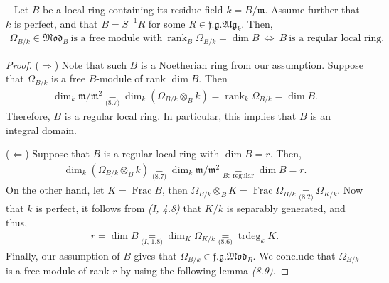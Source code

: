 \documentclass[11pt,a4paper,footinclude=true,headinclude=true]{scrbook} %
\DeclareMathOperator{\Frac}{Frac}
\DeclareMathOperator{\trdeg}{trdeg}
\DeclareMathOperator{\rank}{rank}
\newcommand{\mm}{\mathfrak{m}}
\newcommand{\<}{\langle}
\newcommand{\>}{\rangle}
\newcommand{\fg}{\mathfrak{f.g.}}
\newcommand{\MOD}{\mathfrak{Mod}}
\newcommand{\ALG}{\mathfrak{Alg}}
\newenvironment{theorem}[2][]
{\renewcommand\theinnercustomthm{#2}\innercustomthm[#1]
\begin{mdframed}[backgroundcolor=yellow!20]\ }
{\end{mdframed}\endinnercustomthm}
\begin{document}
\begin{theorem}{8.8}
    Let $B$ be a local ring containing its residue field $k=B/\mm$. Assume further that $k$ is perfect, and that $B=S^{-1}R$ for some $R\in\fg\ALG_k$. Then,
    \begin{align*}
        \Omega_{B/k}\in\MOD_B\ \text{is a free module with}\ \rank_B\Omega_{B/k}=\dim B\ \Longleftrightarrow\ B\ \text{is a regular local ring}.
    \end{align*}
\end{theorem}
\begin{proof}
    ($\Rightarrow$) Note that such $B$ is a Noetherian ring from our assumption. Suppose that $\Omega_{B/k}$ is a free $B$-module of rank $\dim B$. Then
    \begin{align*}
        \dim_k\mm/\mm^2\underset{\textit{(8.7)}}{=}\dim_k(\Omega_{B/k}\otimes_Bk)=\rank_k\Omega_{B/k}=\dim B.
    \end{align*}
    Therefore, $B$ is a regular local ring. In particular, this implies that $B$ is an integral domain.
    
    ($\Leftarrow$) Suppose that $B$ is a regular local ring with $\dim B=r$. Then, 
    \begin{align*}
        \dim_k(\Omega_{B/k}\otimes_Bk)\underset{\textit{(8.7)}}{=}\dim_k\mm/\mm^2\underset{B:\ \text{regular}}{=}\dim B=r.
    \end{align*}
    On the other hand, let $K=\Frac B$, then $\Omega_{B/k}\otimes_BK=\Frac\Omega_{B/k}\underset{\textit{(8.2)}}{=}\Omega_{K/k}$. Now that $k$ is perfect, it follows from \textit{(I, 4.8)} that $K/k$ is separably generated, and thus,
    \begin{align*}
        r=\dim B\underset{\textit{(I, 1.8)}}{=}\dim_K\Omega_{K/k}\underset{\textit{(8.6)}}{=}\trdeg_kK.
    \end{align*}
    Finally, our assumption of $B$ gives that $\Omega_{B/k}\in\fg\MOD_B$. We conclude that $\Omega_{B/k}$ is a free module of rank $r$ by using the following lemma \textit{(8.9)}.
\end{proof}
\end{document}
